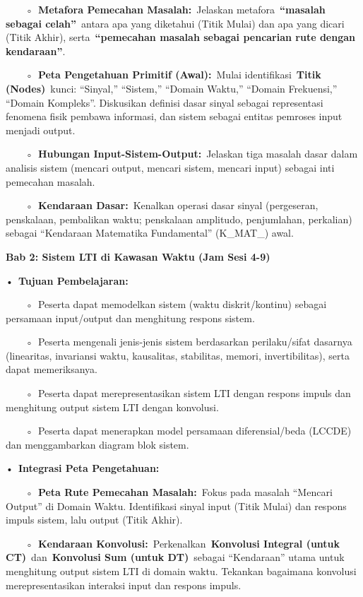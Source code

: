 \documentclass[
  letterpaper,
  DIV=11,
  numbers=noendperiod]{scrreprt}
\begin{document}
~~~~◦~\textbf{Metafora Pemecahan Masalah:}~Jelaskan
metafora~\textbf{``masalah sebagai celah''}~antara apa yang diketahui
(Titik Mulai) dan apa yang dicari (Titik Akhir),
serta~\textbf{``pemecahan masalah sebagai pencarian rute dengan
kendaraan''}.

~~~~◦~\textbf{Peta Pengetahuan Primitif (Awal):}~Mulai
identifikasi~\textbf{Titik (Nodes)}~kunci: ``Sinyal,'' ``Sistem,''
``Domain Waktu,'' ``Domain Frekuensi,'' ``Domain Kompleks''. Diskusikan
definisi dasar sinyal sebagai representasi fenomena fisik pembawa
informasi, dan sistem sebagai entitas pemroses input menjadi output.

~~~~◦~\textbf{Hubungan Input-Sistem-Output:}~Jelaskan tiga masalah dasar
dalam analisis sistem (mencari output, mencari sistem, mencari input)
sebagai inti pemecahan masalah.

~~~~◦~\textbf{Kendaraan Dasar:}~Kenalkan operasi dasar sinyal
(pergeseran, penskalaan, pembalikan waktu; penskalaan amplitudo,
penjumlahan, perkalian) sebagai ``Kendaraan Matematika Fundamental''
(K\_MAT\_) awal.

\textbf{Bab 2: Sistem LTI di Kawasan Waktu (Jam Sesi 4-9)}

•~\textbf{Tujuan Pembelajaran:}

~~~~◦~Peserta dapat memodelkan sistem (waktu diskrit/kontinu) sebagai
persamaan input/output dan menghitung respons sistem.

~~~~◦~Peserta mengenali jenis-jenis sistem berdasarkan perilaku/sifat
dasarnya (linearitas, invariansi waktu, kausalitas, stabilitas, memori,
invertibilitas), serta dapat memeriksanya.

~~~~◦~Peserta dapat merepresentasikan sistem LTI dengan respons impuls
dan menghitung output sistem LTI dengan konvolusi.

~~~~◦~Peserta dapat menerapkan model persamaan diferensial/beda (LCCDE)
dan menggambarkan diagram blok sistem.

•~\textbf{Integrasi Peta Pengetahuan:}

~~~~◦~\textbf{Peta Rute Pemecahan Masalah:}~Fokus pada masalah ``Mencari
Output'' di Domain Waktu. Identifikasi sinyal input (Titik Mulai) dan
respons impuls sistem, lalu output (Titik Akhir).

~~~~◦~\textbf{Kendaraan Konvolusi:}~Perkenalkan~\textbf{Konvolusi
Integral (untuk CT)}~dan~\textbf{Konvolusi Sum (untuk DT)}~sebagai
``Kendaraan'' utama untuk menghitung output sistem LTI di domain waktu.
Tekankan bagaimana konvolusi merepresentasikan interaksi input dan
respons impuls.
\end{document}
